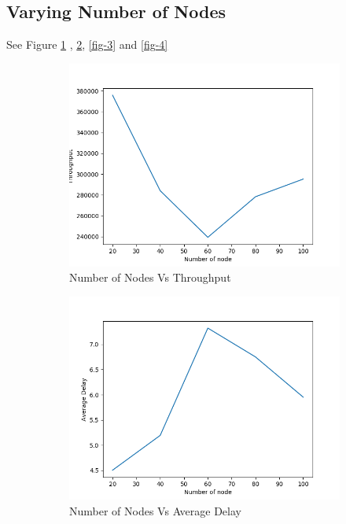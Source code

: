 \documentclass[14pt]{scrartcl} %
\begin{document}
\subsection{Varying Number of Nodes}
See Figure \ref{fig-1} , \ref{fig-2}, \ref{fig-3} and \ref{fig-4}
\begin{figure}[h]
\begin{subfigure}{.5\textwidth}
  \centering
  \includegraphics[width=.8\linewidth]{Graph/nodeVsThroughput.png} 
     \caption{Number of Nodes Vs Throughput}
    \label{fig-1}
\end{subfigure}
\begin{subfigure}{.5\textwidth}
  \centering
  \includegraphics[width=.8\linewidth]{Graph/nodeVsAverageDelay.png} 
    \caption{Number of Nodes Vs Average Delay}
     \label{fig-2}
\end{subfigure}
\begin{subfigure}{.5\textwidth}
  \centering

\end{subfigure}
\end{figure}
\end{document}
